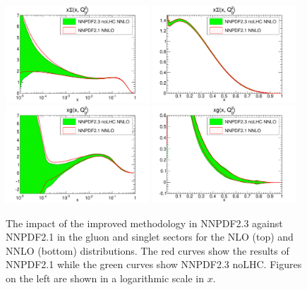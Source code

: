 \begin{figure}[hp!]
\includegraphics[width=0.48\textwidth]{6-LHCimpact/figs/xSinglet_Q_2_log-21-vs-23noLHC-nnlo.pdf}
\includegraphics[width=0.48\textwidth]{6-LHCimpact/figs/xSinglet_Q_2_lin-21-vs-23noLHC-nnlo.pdf}\\
\includegraphics[width=0.48\textwidth]{6-LHCimpact/figs/xg_Q_2_log-21-vs-23noLHC-nnlo.pdf}
\includegraphics[width=0.48\textwidth]{6-LHCimpact/figs/xg_Q_2_lin-21-vs-23noLHC-nnlo.pdf}
\caption[The impact of the improved methodology in NNPDF2.3 against NNPDF2.1 in the gluon and singlet sectors]{The impact of the improved methodology in NNPDF2.3 against NNPDF2.1 in the gluon and singlet sectors for the NLO (top) and NNLO (bottom) distributions. The red curves show the results of NNPDF2.1 while the green curves show NNPDF2.3 noLHC. Figures on the left are shown in a logarithmic scale in $x$.}
\label{fig:23noLHC}
\end{figure}


